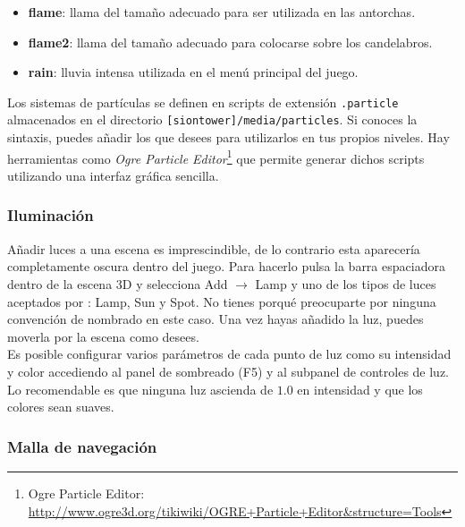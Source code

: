 \begin{itemize}
    \itemsep0em
    \item \textbf{flame}: llama del tamaño adecuado para ser utilizada en las antorchas.
    \item \textbf{flame2}: llama del tamaño adecuado para colocarse sobre los candelabros.
    \item \textbf{rain}: lluvia intensa utilizada en el menú principal del juego.
\end{itemize}


Los sistemas de partículas se definen en scripts de extensión \texttt{.particle}
almacenados en el directorio \texttt{[siontower]/media/particles}. Si conoces
la sintaxis, puedes añadir los que desees para utilizarlos en tus propios niveles.
Hay herramientas como \textit{Ogre Particle Editor}\footnote{Ogre Particle Editor: \url{http://www.ogre3d.org/tikiwiki/OGRE+Particle+Editor&structure=Tools}}
que permite generar dichos scripts utilizando una interfaz gráfica sencilla.

\subsubsection*{Iluminación}

Añadir luces a una escena es imprescindible, de lo contrario esta aparecería
completamente oscura dentro del juego. Para hacerlo pulsa la barra
espaciadora dentro de la escena 3D y selecciona Add $\rightarrow$ Lamp
y uno de los tipos de luces aceptados por \juego: Lamp, Sun y Spot.
No tienes porqué preocuparte por ninguna convención de nombrado en este caso.
Una vez hayas añadido la luz, puedes moverla por la escena como desees.\\

Es posible configurar varios parámetros de cada punto de luz como su intensidad
y color accediendo al panel de sombreado (F5) y al subpanel de controles
de luz. Lo recomendable es que ninguna luz ascienda de $1.0$ en intensidad
y que los colores sean suaves.



\subsubsection*{Malla de navegación}

